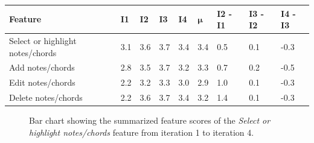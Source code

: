 		\begin{table}[H]
		  \centering
		   \label{tab:summarized-all}
		  \begin{tabular}{|p{2.7cm}|R{.7cm}|R{.7cm}|R{.7cm}|R{.7cm}|R{.5cm}|R{1.4cm}|R{1.4cm}|R{1.4cm}|}
		  	\hline
		  	\textbf{Feature} & \textbf{I1} & \textbf{I2} & \textbf{I3} & \textbf{I4} & \begin{math}\bm{\mu}\end{math} & \textbf{I2 - I1} & \textbf{I3 - I2} & \textbf{I4 - I3} \\ \hline

		  	Select or highlight notes/chords 	& 3.1 & 3.6 & 3.7 & 3.4 & 3.4 & 0.5 & 0.1 & -0.3 \\ \hline
			Add notes/chords 						& 2.8 & 3.5 & 3.7 & 3.2 & 3.3 & 0.7 & 0.2 & -0.5 \\ \hline
			Edit notes/chords 						& 2.2 & 3.2 & 3.3 & 3.0 & 2.9 & 1.0 & 0.1 & -0.3 \\ \hline
			Delete notes/chords 					& 2.2 & 3.6 & 3.7 & 3.4 & 3.2 & 1.4 & 0.1 & -0.3 \\ \hline

		  \end{tabular}
		\end{table}

		\begin{figure}[H]
			\centering
		    \caption{Bar chart showing the summarized feature scores of the \textit{Select or highlight notes/chords} feature from iteration 1 to iteration 4.}
		    \label{fig:select-bar}
		\end{figure} 

